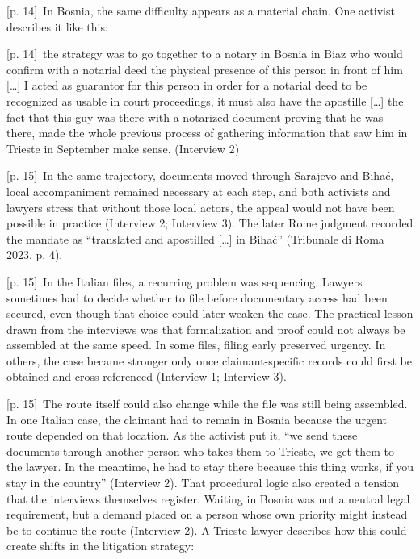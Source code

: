 \documentclass[10pt,a4paper]{article}
\begin{document}
{\scriptsize\color{gray} [p. 14]}\ In Bosnia, the same difficulty appears as a material chain. One activist describes it like this:\par
{\scriptsize\color{gray} [p. 14]}\ the strategy was to go together to a notary in Bosnia in Biaz who would confirm with a notarial deed the physical presence of this person in front of him […] I acted as guarantor for this person in order for a notarial deed to be recognized as usable in court proceedings, it must also have the apostille […] the fact that this guy was there with a notarized document proving that he was there, made the whole previous process of gathering information that saw him in Trieste in September make sense. (Interview 2)\par
{\scriptsize\color{gray} [p. 15]}\ In the same trajectory, documents moved through Sarajevo and Bihać, local accompaniment remained necessary at each step, and both activists and lawyers stress that without those local actors, the appeal would not have been possible in practice (Interview 2; Interview 3). The later Rome judgment recorded the mandate as “translated and apostilled […] in Bihać” (Tribunale di Roma 2023, p. 4).\par
{\scriptsize\color{gray} [p. 15]}\ In the Italian files, a recurring problem was sequencing. Lawyers sometimes had to decide whether to file before documentary access had been secured, even though that choice could later weaken the case. The practical lesson drawn from the interviews was that formalization and proof could not always be assembled at the same speed. In some files, filing early preserved urgency. In others, the case became stronger only once claimant-specific records could first be obtained and cross-referenced (Interview 1; Interview 3).\par
{\scriptsize\color{gray} [p. 15]}\ The route itself could also change while the file was still being assembled. In one Italian case, the claimant had to remain in Bosnia because the urgent route depended on that location. As the activist put it, “we send these documents through another person who takes them to Trieste, we get them to the lawyer. In the meantime, he had to stay there because this thing works, if you stay in the country” (Interview 2). That procedural logic also created a tension that the interviews themselves register. Waiting in Bosnia was not a neutral legal requirement, but a demand placed on a person whose own priority might instead be to continue the route (Interview 2). A Trieste lawyer describes how this could create shifts in the litigation strategy:\par
\end{document}

